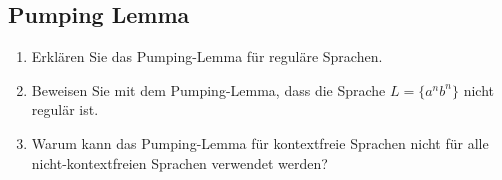 \documentclass[a4paper,12pt]{article}
\begin{document}
	\subsection*{Pumping Lemma}
	\begin{enumerate}
		\item Erklären Sie das Pumping-Lemma für reguläre Sprachen.
		\item Beweisen Sie mit dem Pumping-Lemma, dass die Sprache $L=\{a^n b^n\}$ nicht regulär ist.
		\item Warum kann das Pumping-Lemma für kontextfreie Sprachen nicht für alle nicht-kontextfreien Sprachen verwendet werden?
	\end{enumerate}
	
\end{document}
